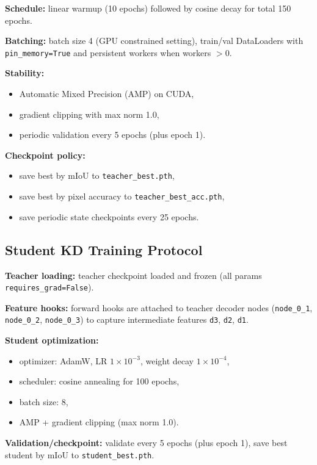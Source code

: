 \documentclass[journal]{IEEEtran}
\begin{document}
\textbf{Schedule:} linear warmup (10 epochs) followed by cosine decay for total 150 epochs.

\textbf{Batching:} batch size 4 (GPU constrained setting), train/val DataLoaders with \texttt{pin\_memory=True} and persistent workers when workers $>0$.

\textbf{Stability:}
\begin{itemize}
    \item Automatic Mixed Precision (AMP) on CUDA,
    \item gradient clipping with max norm 1.0,
    \item periodic validation every 5 epochs (plus epoch 1).
\end{itemize}

\textbf{Checkpoint policy:}
\begin{itemize}
    \item save best by mIoU to \texttt{teacher\_best.pth},
    \item save best by pixel accuracy to \texttt{teacher\_best\_acc.pth},
    \item save periodic state checkpoints every 25 epochs.
\end{itemize}

\subsection{Student KD Training Protocol}
\textbf{Teacher loading:} teacher checkpoint loaded and frozen (all params \texttt{requires\_grad=False}).

\textbf{Feature hooks:} forward hooks are attached to teacher decoder nodes (\texttt{node\_0\_1}, \texttt{node\_0\_2}, \texttt{node\_0\_3}) to capture intermediate features \texttt{d3}, \texttt{d2}, \texttt{d1}.

\textbf{Student optimization:}
\begin{itemize}
    \item optimizer: AdamW, LR $1\times10^{-3}$, weight decay $1\times10^{-4}$,
    \item scheduler: cosine annealing for 100 epochs,
    \item batch size: 8,
    \item AMP + gradient clipping (max norm 1.0).
\end{itemize}

\textbf{Validation/checkpoint:} validate every 5 epochs (plus epoch 1), save best student by mIoU to \texttt{student\_best.pth}.
\end{document}
